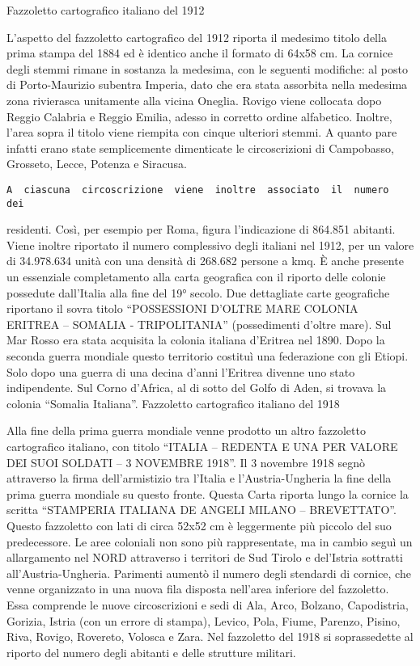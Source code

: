 Fazzoletto cartografico italiano del 1912

L'aspetto del fazzoletto cartografico del 1912 riporta il medesimo
titolo della prima stampa del 1884 ed è identico anche il formato di
64x58 cm. La cornice degli stemmi rimane in sostanza la medesima, con le
seguenti modifiche: al posto di Porto-Maurizio subentra Imperia, dato
che era stata assorbita nella medesima zona rivierasca unitamente alla
vicina Oneglia. Rovigo viene collocata dopo Reggio Calabria e Reggio
Emilia, adesso in corretto ordine alfabetico. Inoltre, l'area sopra il
titolo viene riempita con cinque ulteriori stemmi. A quanto pare infatti
erano state semplicemente dimenticate le circoscrizioni di Campobasso,
Grosseto, Lecce, Potenza e Siracusa.

\begin{verbatim}
A  ciascuna  circoscrizione  viene  inoltre  associato  il  numero   dei
\end{verbatim}

residenti. Così, per esempio per Roma, figura l'indicazione di 864.851
abitanti. Viene inoltre riportato il numero complessivo degli italiani
nel 1912, per un valore di 34.978.634 unità con una densità di 268.682
persone a kmq. È anche presente un essenziale completamento alla carta
geografica con il riporto delle colonie possedute dall'Italia alla fine
del 19° secolo. Due dettagliate carte geografiche riportano il sovra
titolo ``POSSESSIONI D'OLTRE MARE COLONIA ERITREA -- SOMALIA -
TRIPOLITANIA'' (possedimenti d'oltre mare). Sul Mar Rosso era stata
acquisita la colonia italiana d'Eritrea nel 1890. Dopo la seconda guerra
mondiale questo territorio costituì una federazione con gli Etiopi. Solo
dopo una guerra di una decina d'anni l'Eritrea divenne uno stato
indipendente. Sul Corno d'Africa, al di sotto del Golfo di Aden, si
trovava la colonia ``Somalia Italiana''. Fazzoletto cartografico
italiano del 1918

Alla fine della prima guerra mondiale venne prodotto un altro fazzoletto
cartografico italiano, con titolo ``ITALIA -- REDENTA E UNA PER VALORE
DEI SUOI SOLDATI -- 3 NOVEMBRE 1918''. Il 3 novembre 1918 segnò
attraverso la firma dell'armistizio tra l'Italia e l'Austria-Ungheria la
fine della prima guerra mondiale su questo fronte. Questa Carta riporta
lungo la cornice la scritta ``STAMPERIA ITALIANA DE ANGELI MILANO --
BREVETTATO''. Questo fazzoletto con lati di circa 52x52 cm è leggermente
più piccolo del suo predecessore. Le aree coloniali non sono più
rappresentate, ma in cambio seguì un allargamento nel NORD attraverso i
territori de Sud Tirolo e del'Istria sottratti all'Austria-Ungheria.
Parimenti aumentò il numero degli stendardi di cornice, che venne
organizzato in una nuova fila disposta nell'area inferiore del
fazzoletto. Essa comprende le nuove circoscrizioni e sedi di Ala, Arco,
Bolzano, Capodistria, Gorizia, Istria (con un errore di stampa), Levico,
Pola, Fiume, Parenzo, Pisino, Riva, Rovigo, Rovereto, Volosca e Zara.
Nel fazzoletto del 1918 si soprassedette al riporto del numero degli
abitanti e delle strutture militari.

